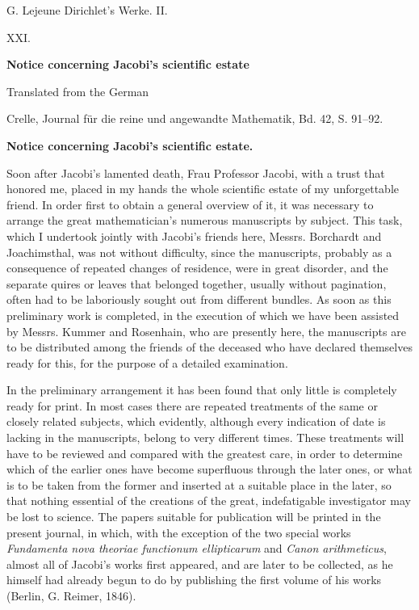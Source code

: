 \documentclass[11pt]{article}
\begin{document}
\begin{center}
{\Large G. Lejeune Dirichlet's Werke. II.}\par\vspace{1.2em}
{\Large XXI.}\par\vspace{0.5em}
{\LARGE \textbf{Notice concerning Jacobi's scientific estate}}\par\vspace{1em}
{\large Translated from the German}\par\vspace{0.5em}
{\small Crelle, Journal für die reine und angewandte Mathematik, Bd. 42, S. 91--92.}
\end{center}

\bigskip
\begin{center}
{\large \textbf{Notice concerning Jacobi's scientific estate.}}
\end{center}

Soon after Jacobi's lamented death, Frau Professor Jacobi, with a trust that honored me, placed in my hands the whole scientific estate of my unforgettable friend. In order first to obtain a general overview of it, it was necessary to arrange the great mathematician's numerous manuscripts by subject. This task, which I undertook jointly with Jacobi's friends here, Messrs. Borchardt and Joachimsthal, was not without difficulty, since the manuscripts, probably as a consequence of repeated changes of residence, were in great disorder, and the separate quires or leaves that belonged together, usually without pagination, often had to be laboriously sought out from different bundles. As soon as this preliminary work is completed, in the execution of which we have been assisted by Messrs. Kummer and Rosenhain, who are presently here, the manuscripts are to be distributed among the friends of the deceased who have declared themselves ready for this, for the purpose of a detailed examination.

In the preliminary arrangement it has been found that only little is completely ready for print. In most cases there are repeated treatments of the same or closely related subjects, which evidently, although every indication of date is lacking in the manuscripts, belong to very different times. These treatments will have to be reviewed and compared with the greatest care, in order to determine which of the earlier ones have become superfluous through the later ones, or what is to be taken from the former and inserted at a suitable place in the later, so that nothing essential of the creations of the great, indefatigable investigator may be lost to science. The papers suitable for publication will be printed in the present journal, in which, with the exception of the two special works \emph{Fundamenta nova theoriae functionum ellipticarum} and \emph{Canon arithmeticus}, almost all of Jacobi's works first appeared, and are later to be collected, as he himself had already begun to do by publishing the first volume of his works (Berlin, G. Reimer, 1846).
\end{document}
